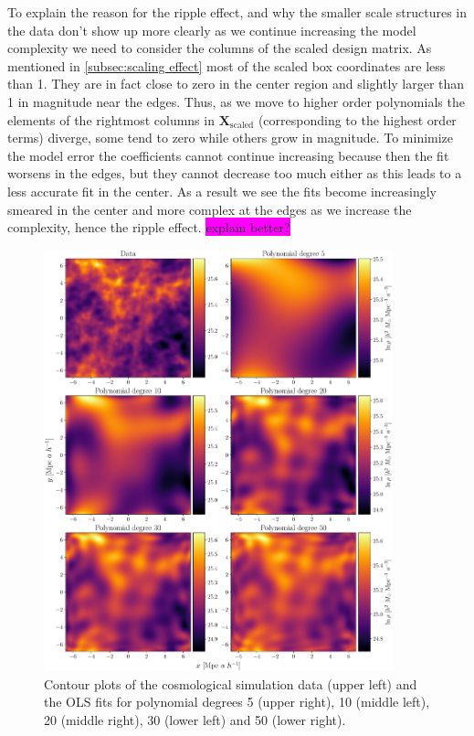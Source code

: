 \documentclass[aps,pra,english,notitlepage,reprint,nofootinbib]{revtex4-1}  %
\begin{document}
To explain the reason for the ripple effect, and why the smaller scale structures in the data don't show up more clearly as we continue increasing the model complexity we need to consider the columns of the scaled design matrix. As mentioned in \cref{subsec:scaling effect} most of the scaled box coordinates are less than 1. They are in fact close to zero in the center region and slightly larger than 1 in magnitude near the edges. Thus, as we move to higher order polynomials the elements of the rightmost columns in $\mathbf{X}_\text{scaled}$ (corresponding to the highest order terms) diverge, some tend to zero while others grow in magnitude. To minimize the model error the coefficients cannot continue increasing because then the fit worsens in the edges, but they cannot decrease too much either as this leads to a less accurate fit in the center. As a result we see the fits become increasingly smeared in the center and more complex at the edges as we increase the complexity, hence the ripple effect. \colorbox{magenta}{explain better?} 

\begin{figure}
  \vspace*{-5pt}
  \centering %
  \includegraphics[width=0.9\textwidth]{../figs/density_complexity.pdf}
  \caption{Contour plots of the cosmological simulation data (upper left) and the OLS fits for polynomial degrees 5 (upper right), 10 (middle left), 20 (middle right), 30 (lower left) and 50 (lower right).}\label{fig:density complexity}
  \vspace*{-5pt}
\end{figure}
\end{document}
